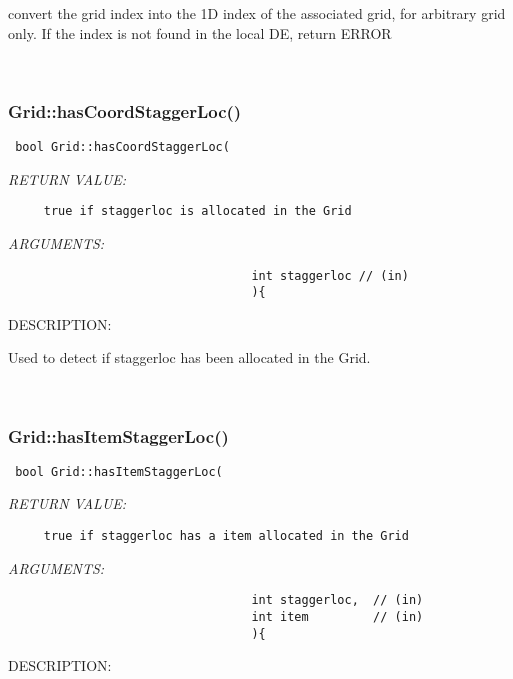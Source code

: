     convert the grid index into the 1D index of the associated grid, for arbitrary 
    grid only.  If the index is not found in the local DE, return ERROR
  
   
 
\mbox{}\hrulefill\
 
\subsubsection [Grid::hasCoordStaggerLoc()] {Grid::hasCoordStaggerLoc()}


  
\begin{verbatim} bool Grid::hasCoordStaggerLoc(\end{verbatim}{\em RETURN VALUE:}
\begin{verbatim}     true if staggerloc is allocated in the Grid
     \end{verbatim}{\em ARGUMENTS:}
\begin{verbatim}                                  int staggerloc // (in)
                                  ){\end{verbatim}
{\sf DESCRIPTION:\\ }


    Used to detect if staggerloc has been allocated in the Grid.
  
   
 
\mbox{}\hrulefill\
 
\subsubsection [Grid::hasItemStaggerLoc()] {Grid::hasItemStaggerLoc()}


  
\begin{verbatim} bool Grid::hasItemStaggerLoc(\end{verbatim}{\em RETURN VALUE:}
\begin{verbatim}     true if staggerloc has a item allocated in the Grid
     \end{verbatim}{\em ARGUMENTS:}
\begin{verbatim}                                  int staggerloc,  // (in)
                                  int item         // (in)
                                  ){\end{verbatim}
{\sf DESCRIPTION:\\ }


